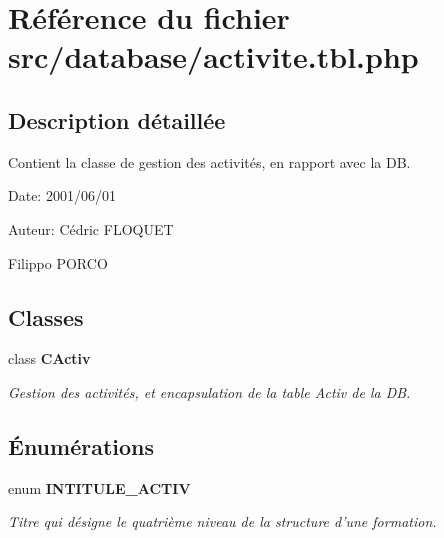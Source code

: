 \section{Référence du fichier src/database/activite.tbl.php}
\label{activite_8tbl_8php}


\subsection{Description détaillée}
Contient la classe de gestion des activités, en rapport avec la DB. 

\begin{Desc}
\item[Date:]2001/06/01\end{Desc}
\begin{Desc}
\item[Auteur:]Cédric FLOQUET 

Filippo PORCO \end{Desc}


\subsection*{Classes}
\begin{CompactItemize}
\item 
class {\bf CActiv}
\begin{CompactList}\small\item\em Gestion des activités, et encapsulation de la table Activ de la DB. \item\end{CompactList}\end{CompactItemize}
\subsection*{Énumérations}
\begin{CompactItemize}
\item 
enum {\bf INTITULE\_\-ACTIV} 
\begin{CompactList}\small\item\em Titre qui désigne le quatrième niveau de la structure d'une formation. \item\end{CompactList}\end{CompactItemize}
